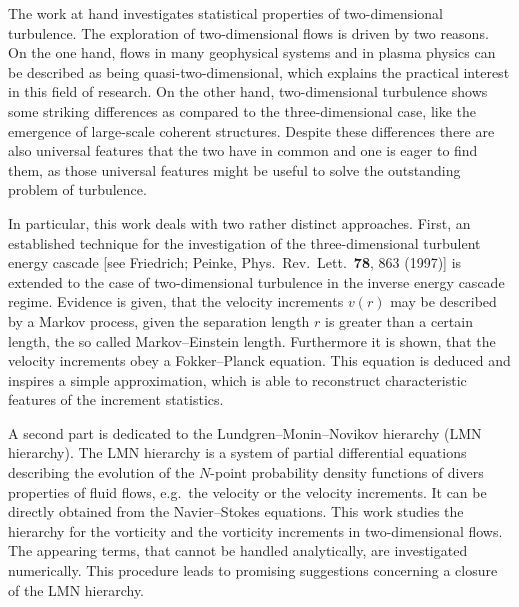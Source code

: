 The work at hand investigates statistical properties of two-dimensional turbulence.
The exploration of two-dimensional flows is driven by two reasons.
On the one hand, flows in many geophysical systems and in plasma physics can be described as being quasi-two-dimensional, which explains the practical interest in this field of research.
On the other hand, two-dimensional turbulence shows some striking differences as compared to the three-dimensional case, like the emergence of large-scale coherent structures.
Despite these differences there are also universal features that the two have in common and one is eager to find them, as those universal features might be useful to solve the outstanding problem of turbulence.

In particular, this work deals with two rather distinct approaches.
First, an established technique for the investigation of the three-dimensional turbulent energy cascade [see Friedrich; Peinke, Phys.~Rev.~Lett.~\textbf{78}, 863 (1997)] is extended to the case of two-dimensional turbulence in the inverse energy cascade regime.
Evidence is given, that the velocity increments $v(r)$ may be described by a Markov process, given the separation length $r$ is greater than a certain length, the so called Markov--Einstein length.
Furthermore it is shown, that the velocity increments obey a Fokker--Planck equation.
This equation is deduced and inspires a simple approximation, which is able to reconstruct characteristic features of the increment statistics.

A second part is dedicated to the Lundgren--Monin--Novikov hierarchy (LMN hierarchy).
The LMN hierarchy is a system of partial differential equations describing the evolution of the $N$-point probability density functions of divers properties of fluid flows, e.g.~the velocity or the velocity increments.
It can be directly obtained from the Navier--Stokes equations.
This work studies the hierarchy for the vorticity and the vorticity increments in two-dimensional flows.
The appearing terms, that cannot be handled analytically, are investigated numerically.
This procedure leads to promising suggestions concerning a closure of the LMN hierarchy.
